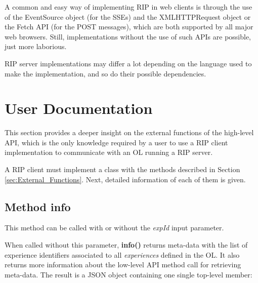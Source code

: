 A common and easy way of implementing RIP in web clients is through the use of the EventSource object \cite{eventsource} (for the SSEs) and the XMLHTTPRequest object \cite{xhr} or the Fetch API \cite{fetch} (for the POST messages), which are both supported by all major web browsers. Still, implementations without the use of such APIs are possible, just more laborious. 

RIP server implementations may differ a lot depending on the language used to make the implementation, and so do their possible dependencies.

\section{User Documentation}
\label{sec:User_Doc}
This section provides a deeper insight on the  external functions of the high-level API, which is the only knowledge required by a user to use a RIP client implementation to communicate with an OL running a RIP server.

A RIP client must implement a class with the methods described in Section \ref{sec:External_Functions}. Next, detailed information of each of them is given. 

\subsection{Method info}
This method can be called with or without the \textit{expId} input parameter.

When called without this parameter, \textbf{info()} returns meta-data with the list of experience identifiers associated to all \textit{experiences} defined in the OL. It also returns more information about the low-level API method call for retrieving meta-data. The result is a JSON object containing one single top-level member:

